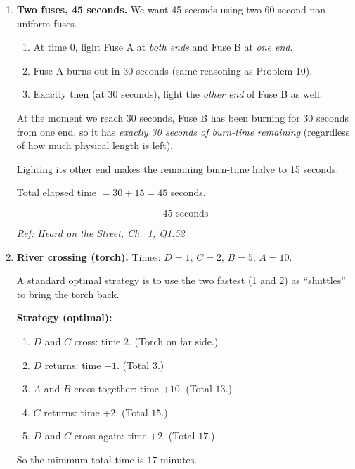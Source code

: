 \documentclass[11pt]{article}
\begin{document}
\begin{enumerate}[label=\textbf{\arabic*.}]
\hfill{\small\textit{Ref: Heard on the Street, Ch.\ 1, Q1.51}}

\item \textbf{Two fuses, 45 seconds.}
We want 45 seconds using two 60-second non-uniform fuses.

\begin{enumerate}[leftmargin=2em]
\item At time 0, light Fuse A at \emph{both ends} and Fuse B at \emph{one end}.
\item Fuse A burns out in 30 seconds (same reasoning as Problem 10).
\item Exactly then (at 30 seconds), light the \emph{other end} of Fuse B as well.
\end{enumerate}

At the moment we reach 30 seconds, Fuse B has been burning for 30 seconds from one end, so it has \emph{exactly 30 seconds of burn-time remaining} (regardless of how much physical length is left).

Lighting its other end makes the remaining burn-time halve to 15 seconds.

Total elapsed time \(=30+15=45\) seconds.

\[
\boxed{45\text{ seconds}}
\]

\hfill{\small\textit{Ref: Heard on the Street, Ch.\ 1, Q1.52}}

\item \textbf{River crossing (torch).}
Times: \(D=1,\,C=2,\,B=5,\,A=10\).

A standard optimal strategy is to use the two fastest (1 and 2) as ``shuttles'' to bring the torch back.

\medskip
\noindent\textbf{Strategy (optimal):}
\begin{enumerate}[leftmargin=2em]
\item \(D\) and \(C\) cross: time \(2\). (Torch on far side.)
\item \(D\) returns: time \(+1\). (Total \(3\).)
\item \(A\) and \(B\) cross together: time \(+10\). (Total \(13\).)
\item \(C\) returns: time \(+2\). (Total \(15\).)
\item \(D\) and \(C\) cross again: time \(+2\). (Total \(17\).)
\end{enumerate}

So the minimum total time is \(\boxed{17\text{ minutes}}\).


\end{enumerate}
\end{document}
